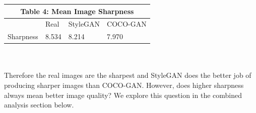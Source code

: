 \documentclass[10pt]{article}
\begin{document}
\begin{multicols*}{2}
        \begin{tabular}{ |p{2cm}|p{2cm}|p{2cm}|p{2cm}|  }
             \hline
             \multicolumn{4}{|c|}{Table 4: \textbf{Mean Image Sharpness}} \\
             \hline
            & Real & StyleGAN & COCO-GAN  \\
            \hline
            Sharpness & 8.534    & 8.214      & 7.970\\
            \hline
        \end{tabular}
        \\\\
        Therefore the real images are the sharpest and StyleGAN does the better job of producing sharper images than COCO-GAN.
        However, does higher sharpness always mean better image quality?
        We explore this question in the combined analysis section below.


\end{multicols*}
\end{document}
